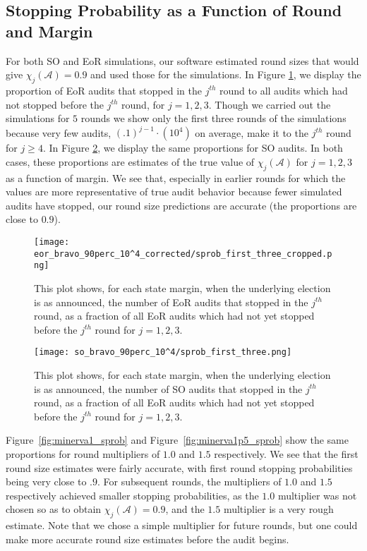 \subsection{Stopping Probability as a Function of Round and Margin}
For both SO and EoR \BRAVO simulations, our software estimated round sizes that would give $\chi_j(\mathcal{A}) = 0.9$ and used those for the simulations. In Figure \ref{fig:eor_bravo_sprob}, we display the proportion of EoR \BRAVO audits that stopped in the $j^{th}$ round
to all audits which had not stopped before the $j^{th}$ round, for $j=1,2,3$. Though we carried out the simulations for $5$ rounds we show only the first three rounds of the simulations because very few audits, $(.1)^{j-1}\cdot(10^4)$ on average, 
make it to the $j^{th}$ round for $j \geq 4$. In Figure \ref{fig:so_bravo_sprob}, we display the same proportions for SO \BRAVO audits. 
In both cases, these proportions are estimates of the true value of $\chi_j(\mathcal{A})$ for $j=1,2,3$ as a function of margin. 
We see that, especially in earlier rounds for which 
the values are more representative of true audit behavior because fewer simulated audits have stopped, 
our round size predictions are accurate (the proportions are close to $0.9$).

\begin{figure}
\texttt{[image: eor\_bravo\_90perc\_10^4\_corrected/sprob\_first\_three\_cropped.png]}\caption{
This plot shows, for each state margin, when the underlying election is as announced, the number of EoR \BRAVO audits that stopped in the $j^{th}$ round,
as a fraction of all EoR \BRAVO audits which had not yet stopped before the $j^{th}$ round for $j=1,2,3$.}
\label{fig:eor_bravo_sprob}
\end{figure}

\begin{figure}
\texttt{[image: so\_bravo\_90perc\_10^4/sprob\_first\_three.png]}\caption{
This plot shows, for each state margin, when the underlying election is as announced, the number of SO \BRAVO audits that stopped in the $j^{th}$ round,
as a fraction of all EoR \BRAVO audits which had not yet stopped before the $j^{th}$ round for $j=1,2,3$.}
\label{fig:so_bravo_sprob}
\end{figure}

Figure~\ref{fig:minerva1_sprob} and Figure~\ref{fig:minerva1p5_sprob} show the same proportions for \Minerva round multipliers of $1.0$ and $1.5$ respectively. We see that the first round size estimates were fairly accurate, with first round stopping probabilities being very close to $.9$. For subsequent rounds, the multipliers of $1.0$ and $1.5$ respectively achieved smaller stopping probabilities, as the $1.0$ multiplier was not chosen so as to obtain $\chi_j({\mathcal A}) = 0.9$, and the $1.5$ multiplier is a very rough estimate. Note that we chose a simple multiplier for future rounds, but one could make more accurate round size estimates before the audit begins. 


